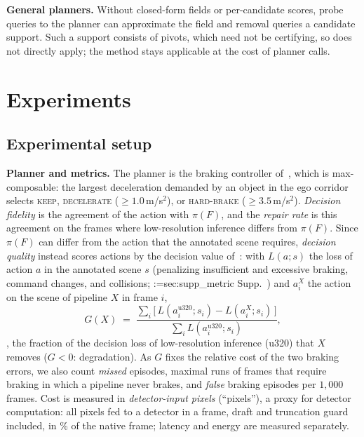 \documentclass[10pt,twocolumn,letterpaper]{article}
\makeatletter
\newcommand{\full}{F}             %
\newcommand{\policy}{\pi}         %
\newcommand{\G}{G}                %
\theoremstyle{definition}
\theoremstyle{remark}
\DeclareRobustCommand{\supp}[1]{\def\supp@list{}\@for\supp@i:=#1\do{\ifx\supp@list\@empty\edef\supp@list{S-\supp@i}\else\edef\supp@list{\supp@list,S-\supp@i}\fi}%
\edef\supp@cmd{\noexpand\Cref*{\supp@list}}Supp.~\supp@cmd}
\makeatother
\begin{document}
\noindent\textbf{General planners.}
Without closed-form fields or per-candidate scores, probe queries to the planner can approximate the field and removal queries a candidate support.
Such a support consists of pivots, which need not be certifying, so  does not directly apply; the method stays applicable at the cost of planner calls.
\section{Experiments}
\label{sec:exp}

\subsection{Experimental setup}
\label{sec:setup}

\noindent\textbf{Planner and metrics.}
The planner is the braking controller of~\cite{deep}, which is max-composable: the largest deceleration demanded by an object in the ego corridor selects \textsc{keep}, \textsc{decelerate} ($\ge1.0$\,m/s$^2$), or \textsc{hard-brake} ($\ge3.5$\,m/s$^2$).
\emph{Decision fidelity} is the agreement of the action with $\policy(\full)$, and the \emph{repair rate} is this agreement on the frames where low-resolution inference differs from $\policy(\full)$.
Since $\policy(\full)$ can differ from the action that the annotated scene requires, \emph{decision quality} instead scores actions by the decision value of~\cite{deep}: with $L(a;s)$ the loss of action $a$ in the annotated scene $s$ (penalizing insufficient and excessive braking, command changes, and collisions; \supp{sec:supp_metric}) and $a_i^X$ the action on the scene of pipeline $X$ in frame $i$,
\begin{equation}
\G(X) \;=\; \frac{\sum_i \big[\,L(a_i^{\mathrm{u320}};s_i) - L(a_i^{X};s_i)\,\big]}{\sum_i L(a_i^{\mathrm{u320}};s_i)} ,
\label{eq:G}
\end{equation}
\ie, the fraction of the decision loss of low-resolution inference (u320) that $X$ removes ($\G<0$: degradation).
As $\G$ fixes the relative cost of the two braking errors, we also count \emph{missed} episodes, maximal runs of frames that require braking in which a pipeline never brakes, and \emph{false} braking episodes per $1{,}000$ frames.
Cost is measured in \emph{detector-input pixels} (``pixels''), a proxy for detector computation: all pixels fed to a detector in a frame, draft and truncation guard included, in \% of the native frame; latency and energy are measured separately.
\end{document}
